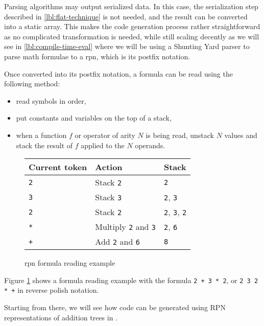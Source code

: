 \documentclass[../main]{subfiles}
\begin{document}
Parsing algorithms may output serialized data. In this case, the serialization
step described in \ref{lbl:flat-technique} is not needed, and the result
can be converted into a static array.
This makes the code generation process rather straightforward as no complicated
transformation is needed, while still scaling decently as we will see in
\ref{lbl:compile-time-eval} where we will be using a
Shunting Yard parser \cite{shunting-yard} to parse math formulae to a
\gls{rpn}, which is its postfix notation.

Once converted into its postfix notation,
a formula can be read using the following method:

\begin{itemize}
\item read symbols in order,
\item put constants and variables on the top of a stack,
\item when a function $f$ or operator of arity $N$ is being read,
      unstack $N$ values and stack the result of $f$ applied
      to the $N$ operands.
\end{itemize}

\begin{figure}
\begin{tabular}{|l|l|l|}
\hline
Current token & Action & Stack \\
\hline
\lstinline|2| & Stack \lstinline|2| & \lstinline|2| \\
\lstinline|3| & Stack \lstinline|3| & \lstinline|2|, \lstinline|3| \\
\lstinline|2| & Stack \lstinline|2| & \lstinline|2|, \lstinline|3|, \lstinline|2| \\
\lstinline|*| & Multiply \lstinline|2| and \lstinline|3| & \lstinline|2|, \lstinline|6| \\
\lstinline|+| & Add \lstinline|2| and \lstinline|6| & \lstinline|8| \\
\hline
\end{tabular}
\caption{\gls{rpn} formula reading example}
\label{fig:rpn-reading-example}
\end{figure}

Figure \ref{fig:rpn-reading-example} shows a formula reading example with
the formula \lstinline{2 + 3 * 2}, or \lstinline{2 3 2 * +} in
reverse polish notation.

Starting from there, we will see how code can be generated using
RPN representations of addition trees in \cpp.
\end{document}

